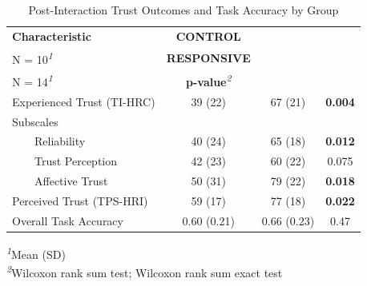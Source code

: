\begin{table}[t]
\caption{Post-Interaction Trust Outcomes and Task Accuracy by Group} 
\fontsize{10.0pt}{12.0pt}\selectfont
\begin{tabular*}{\linewidth}{@{\extracolsep{\fill}}lccc}
\toprule
\textbf{Characteristic} & \textbf{CONTROL}\\
N = 10\textsuperscript{\textit{1}} & \textbf{RESPONSIVE}\\
N = 14\textsuperscript{\textit{1}} & \textbf{p-value}\textsuperscript{\textit{2}} \\ 
\midrule\addlinespace[2.5pt]
Experienced Trust (TI-HRC) & 39 (22) & 67 (21) & {\bfseries 0.004} \\ 
Subscales &  &  &  \\ 
    Reliability & 40 (24) & 65 (18) & {\bfseries 0.012} \\ 
    Trust Perception & 42 (23) & 60 (22) & 0.075 \\ 
    Affective Trust & 50 (31) & 79 (22) & {\bfseries 0.018} \\ 
Perceived Trust (TPS-HRI) & 59 (17) & 77 (18) & {\bfseries 0.022} \\ 
Overall Task Accuracy & 0.60 (0.21) & 0.66 (0.23) & 0.47 \\ 
\bottomrule
\end{tabular*}
\begin{minipage}{\linewidth}
\textsuperscript{\textit{1}}Mean (SD)\\
\textsuperscript{\textit{2}}Wilcoxon rank sum test; Wilcoxon rank sum exact test\\
\end{minipage}
\end{table}

